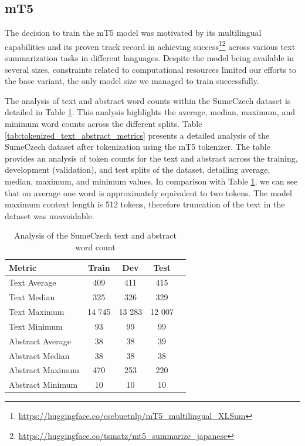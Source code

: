 \documentclass[english, ba, kiv, he, iso690numb, pdf, viewonly]{fasthesis}
\begin{document}
\subsection{mT5} \label{impl:mt5}
The decision to train the mT5 model was motivated by its multilingual capabilities and its proven track record in achieving success\footnote{\url{https://huggingface.co/csebuetnlp/mT5_multilingual_XLSum}}\footnote{\url{https://huggingface.co/tsmatz/mt5_summarize_japanese}} across various text summarization tasks in different languages. Despite the model being available in several sizes, constraints related to computational resources limited our efforts to the base variant, the only model size we managed to train successfully. 

The analysis of text and abstract word counts within the SumeCzech dataset is detailed in Table \ref{tab:text_word_count_metrics}. This analysis highlights the average, median, maximum, and minimum word counts across the different splits. Table \ref{tab:tokenized_text_abstract_metrics} presents a detailed analysis of the SumeCzech dataset after tokenization using the mT5 tokenizer. The table provides an analysis of token counts for the text and abstract across the training, development (validation), and test splits of the dataset, detailing average, median, maximum, and minimum values. In comparison with Table \ref{tab:text_word_count_metrics}, we can see that on average one word is approximately equivalent to two tokens. The model maximum context length is 512 tokens, therefore truncation of the text in the dataset was unavoidable.

\begin{table}[htbp]
    \centering
    \caption{Analysis of the SumeCzech text and abstract word count}
    \label{tab:text_word_count_metrics}
    \begin{tabular}{lcccc}
        \toprule
        \textbf{Metric} & {\textbf{Train}} & {\textbf{Dev}} & {\textbf{Test}} \\
        \midrule
        Text Average & 409 & 411 & 415 \\
        Text Median & 325 & 326 & 329 \\
        Text Maximum & 14 745 & 13 283 & 12 007 \\
        Text Minimum & 93 & 99 & 99 \\
        \midrule
        Abstract Average & 38 & 38 & 39 \\
        Abstract Median & 38 & 38 & 38 \\
        Abstract Maximum & 470 & 253 & 220 \\
        Abstract Minimum & 10 & 10 & 10 \\
        \bottomrule
    \end{tabular}
\end{table}
\end{document}
